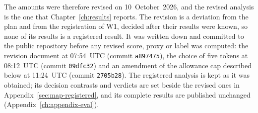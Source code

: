 The amounts were therefore revised on 10~October~2026, and the revised analysis is the one that Chapter~\ref{ch:results} reports. The revision is a deviation from the plan and from the registration of W1, decided after their results were known, so none of its results is a registered result. It was written down and committed to the public repository before any revised score, proxy or label was computed: the revision document at 07:54~UTC (commit \texttt{a897475}), the choice of five tokens at 08:12~UTC (commit \texttt{09dfc32}) and an amendment of the allowance cap described below at 11:24~UTC (commit \texttt{2705b28}). The registered analysis is kept as it was obtained; its decision contrasts and verdicts are set beside the revised ones in Appendix~\ref{sec:map-registered}, and its complete results are published unchanged (Appendix~\ref{ch:appendix-eval}).

